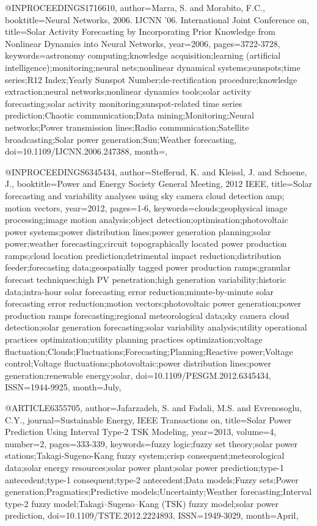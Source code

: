 {@INPROCEEDINGS{1716610, 
author={Marra, S. and Morabito, F.C.}, 
booktitle={Neural Networks, 2006. IJCNN '06. International Joint Conference on}, 
title={Solar Activity Forecasting by Incorporating Prior Knowledge from Nonlinear Dynamics into Neural Networks}, 
year={2006}, 
pages={3722-3728}, 
keywords={astronomy computing;knowledge acquisition;learning (artificial intelligence);monitoring;neural nets;nonlinear dynamical systems;sunspots;time series;R12 Index;Yearly Sunspot Number;de-rectification procedure;knowledge extraction;neural networks;nonlinear dynamics tools;solar activity forecasting;solar activity monitoring;sunspot-related time series prediction;Chaotic communication;Data mining;Monitoring;Neural networks;Power transmission lines;Radio communication;Satellite broadcasting;Solar power generation;Sun;Weather forecasting}, 
doi={10.1109/IJCNN.2006.247388}, 
month={},}

@INPROCEEDINGS{6345434, 
author={Stefferud, K. and Kleissl, J. and Schoene, J.}, 
booktitle={Power and Energy Society General Meeting, 2012 IEEE}, 
title={Solar forecasting and variability analyses using sky camera cloud detection amp; motion vectors}, 
year={2012}, 
pages={1-6}, 
keywords={clouds;geophysical image processing;image motion analysis;object detection;optimisation;photovoltaic power systems;power distribution lines;power generation planning;solar power;weather forecasting;circuit topographically located power production ramps;cloud location prediction;detrimental impact reduction;distribution feeder;forecasting data;geospatially tagged power production ramps;granular forecast techniques;high PV penetration;high generation variability;historic data;intra-hour solar forecasting error reduction;minute-by-minute solar forecasting error reduction;motion vectors;photovoltaic power generation;power production ramps forecasting;regional meteorological data;sky camera cloud detection;solar generation forecasting;solar variability analysis;utility operational practices optimization;utility planning practices optimization;voltage fluctuation;Clouds;Fluctuations;Forecasting;Planning;Reactive power;Voltage control;Voltage fluctuations;photovoltaic;power distribution lines;power generation;renewable energy;solar}, 
doi={10.1109/PESGM.2012.6345434}, 
ISSN={1944-9925}, 
month={July},}

@ARTICLE{6355705, 
author={Jafarzadeh, S. and Fadali, M.S. and Evrenosoglu, C.Y.}, 
journal={Sustainable Energy, IEEE Transactions on}, 
title={Solar Power Prediction Using Interval Type-2 TSK Modeling}, 
year={2013}, 
volume={4}, 
number={2}, 
pages={333-339}, 
keywords={fuzzy logic;fuzzy set theory;solar power stations;Takagi-Sugeno-Kang fuzzy system;crisp consequent;meteorological data;solar energy resources;solar power plant;solar power prediction;type-1 antecedent;type-1 consequent;type-2 antecedent;Data models;Fuzzy sets;Power generation;Pragmatics;Predictive models;Uncertainty;Weather forecasting;Interval type-2 fuzzy model;Takagi–Sugeno–Kang (TSK) fuzzy model;solar power prediction}, 
doi={10.1109/TSTE.2012.2224893}, 
ISSN={1949-3029}, 
month={April},}

}
